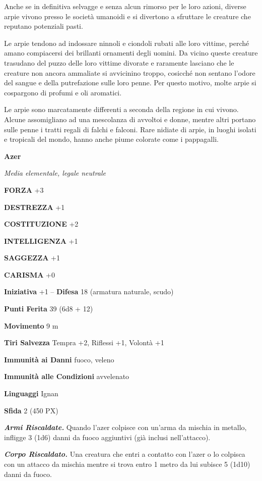\begin{multicols}{2}
Anche se in definitiva selvagge e senza alcun rimorso per le loro azioni, diverse arpie vivono presso le società umanoidi e si divertono a sfruttare le creature che reputano potenziali pasti.

Le arpie tendono ad indossare ninnoli e ciondoli rubati alle loro vittime, perché amano compiacersi dei brillanti ornamenti degli uomini. Da vicino queste creature trasudano del puzzo delle loro vittime divorate e raramente lasciano che le creature non ancora ammaliate si avvicinino troppo, cosicché non sentano l'odore del sangue e della putrefazione sulle loro penne. Per questo motivo, molte arpie si cospargono di profumi e oli aromatici.

Le arpie sono marcatamente differenti a seconda della regione in cui vivono. Alcune assomigliano ad una mescolanza di avvoltoi e donne, mentre altri portano sulle penne i tratti regali di falchi e falconi. Rare nidiate di arpie, in luoghi isolati e tropicali del mondo, hanno anche piume colorate come i pappagalli.

\medskip{}\textbf{Azer}

\textit{Media elementale, legale neutrale}

\textbf{FORZA} +3

\textbf{DESTREZZA} +1

\textbf{COSTITUZIONE} +2

\textbf{INTELLIGENZA} +1

\textbf{SAGGEZZA} +1

\textbf{CARISMA} +0

\textbf{Iniziativa} +1 -- \textbf{Difesa} 18 (armatura naturale, scudo)

\textbf{Punti Ferita} 39 (6d8 + 12)

\textbf{Movimento} 9 m

\textbf{Tiri Salvezza} Tempra +2, Riflessi +1, Volontà +1

\textbf{Immunità ai Danni} fuoco, veleno

\textbf{Immunità alle Condizioni} avvelenato

\textbf{Linguaggi} Ignan

\textbf{Sfida} 2 (450 PX)

\textit{\textbf{Armi Riscaldate.}} Quando l'azer colpisce con un'arma da mischia in metallo, infligge 3 (1d6) danni da fuoco aggiuntivi (già inclusi nell'attacco).

\textit{\textbf{Corpo Riscaldato.}} Una creatura che entri a contatto con l'azer o lo colpisca con un attacco da mischia mentre si trova entro 1 metro da lui subisce 5 (1d10) danni da fuoco.


\end{multicols}
